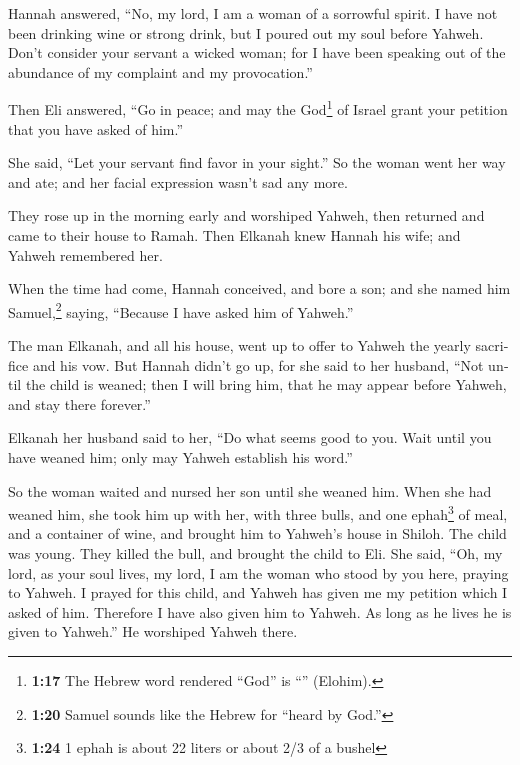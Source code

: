 \begin{paracol}{2}
\begin{otherlanguage}{english}
 Hannah answered, ``No, my lord, I am a woman of a
sorrowful spirit. I have not been drinking wine or strong drink, but I
poured out my soul before Yahweh.  Don't consider your
servant a wicked woman; for I have been speaking out of the abundance of
my complaint and my provocation.''

 Then Eli answered, ``Go in peace; and may the
God\footnote{\textbf{1:17} The Hebrew word rendered ``God'' is
  ``'' (Elohim).} of Israel grant your petition that you
have asked of him.''

 She said, ``Let your servant find favor in your sight.''
So the woman went her way and ate; and her facial expression wasn't sad
any more.

 They rose up in the morning early and worshiped Yahweh,
then returned and came to their house to Ramah. Then Elkanah knew Hannah
his wife; and Yahweh remembered her.

 When the time had come, Hannah conceived, and bore a
son; and she named him Samuel,\footnote{\textbf{1:20} Samuel sounds like
  the Hebrew for ``heard by God.''} saying, ``Because I have asked him
of Yahweh.''

 The man Elkanah, and all his house, went up to offer to
Yahweh the yearly sacrifice and his vow.  But Hannah
didn't go up, for she said to her husband, ``Not until the child is
weaned; then I will bring him, that he may appear before Yahweh, and
stay there forever.''

 Elkanah her husband said to her, ``Do what seems good to
you. Wait until you have weaned him; only may Yahweh establish his
word.''

So the woman waited and nursed her son until she weaned him.
 When she had weaned him, she took him up with her, with
three bulls, and one ephah\footnote{\textbf{1:24} 1 ephah is about 22
  liters or about 2/3 of a bushel} of meal, and a container of wine, and
brought him to Yahweh's house in Shiloh. The child was young.
 They killed the bull, and brought the child to Eli.
 She said, ``Oh, my lord, as your soul lives, my lord, I
am the woman who stood by you here, praying to Yahweh.  I
prayed for this child, and Yahweh has given me my petition which I asked
of him.  Therefore I have also given him to Yahweh. As
long as he lives he is given to Yahweh.'' He worshiped Yahweh there.


\end{otherlanguage}
\end{paracol}
